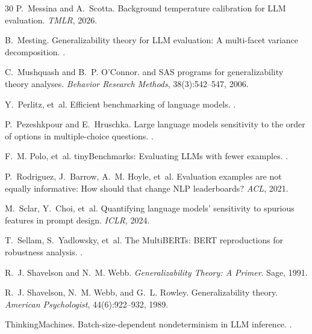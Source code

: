 \documentclass[11pt,letterpaper]{article}
\begin{document}
\begin{thebibliography}{30}
P.~Messina and A.~Scotta.
\newblock Background temperature calibration for {LLM} evaluation.
\newblock \emph{TMLR}, 2026.

B.~Mesting.
\newblock Generalizability theory for {LLM} evaluation: A multi-facet variance decomposition.
.

C.~Mushquash and B.~P. O'Connor.
 and {SAS} programs for generalizability theory analyses.
\newblock \emph{Behavior Research Methods}, 38(3):542--547, 2006.

Y.~Perlitz, et~al.
\newblock Efficient benchmarking of language models.
.

P.~Pezeshkpour and E.~Hruschka.
\newblock Large language models sensitivity to the order of options in multiple-choice questions.
.

F.~M. Polo, et~al.
\newblock tiny{B}enchmarks: Evaluating {LLM}s with fewer examples.
.

P.~Rodriguez, J.~Barrow, A.~M. Hoyle, et~al.
\newblock Evaluation examples are not equally informative: How should that change {NLP} leaderboards?
\newblock \emph{ACL}, 2021.

M.~Sclar, Y.~Choi, et~al.
\newblock Quantifying language models' sensitivity to spurious features in prompt design.
\newblock \emph{ICLR}, 2024.

T.~Sellam, S.~Yadlowsky, et~al.
\newblock The {MultiBERTs}: {BERT} reproductions for robustness analysis.
.

R.~J. Shavelson and N.~M. Webb.
\newblock \emph{Generalizability Theory: A Primer}.
\newblock Sage, 1991.

R.~J. Shavelson, N.~M. Webb, and G.~L. Rowley.
\newblock Generalizability theory.
\newblock \emph{American Psychologist}, 44(6):922--932, 1989.

ThinkingMachines.
\newblock Batch-size-dependent nondeterminism in {LLM} inference.
.


\end{thebibliography}
\end{document}
